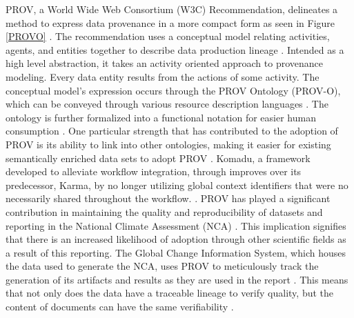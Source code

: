 PROV, a World Wide Web Consortium (W3C) Recommendation, delineates a method to express data provenance in a more compact form as seen in Figure \ref{PROVO} \cite{Gil2013} \cite{Gil2013a} \cite{Groth2013}.
The recommendation uses a conceptual model relating activities, agents, and entities together to describe data production lineage \cite{Moreau2013c} \cite{Nies2013} \cite{Nies2013a}.
Intended as a high level abstraction, it takes an activity oriented approach to provenance modeling.
Every data entity results from the actions of some activity.
The conceptual model's expression occurs through the PROV Ontology (PROV-O), which can be conveyed through various resource description languages \cite{Lebo2013} \cite{Hua2013} \cite{Klyne2013}.
The ontology is further formalized into a functional notation for easier human consumption \cite{Moreau2013b} \cite{Cheney2013a}.
One particular strength that has contributed to the adoption of PROV is its ability to link into other ontologies, making it easier for existing semantically enriched data sets to adopt PROV \cite{Miles2013} \cite{Moreau2013}.
Komadu, a framework developed to alleviate workflow integration, through improves over its predecessor, Karma, by no longer utilizing global context identifiers that were no necessarily shared throughout the workflow. \cite{Suriarachchi_2015}.
PROV has played a significant contribution in maintaining the quality and reproducibility of datasets and reporting in the National Climate Assessment (NCA) \cite{Ma2014191}.
This implication signifies that there is an increased likelihood of adoption through other scientific fields as a result of this reporting.
The Global Change Information System, which houses the data used to generate the NCA, uses PROV to meticulously track the generation of its artifacts and results as they are used in the report \cite{Tilmes2012}.
This means that not only does the data have a traceable lineage to verify quality, but the content of documents can have the same verifiability \cite{Ma2014}.

